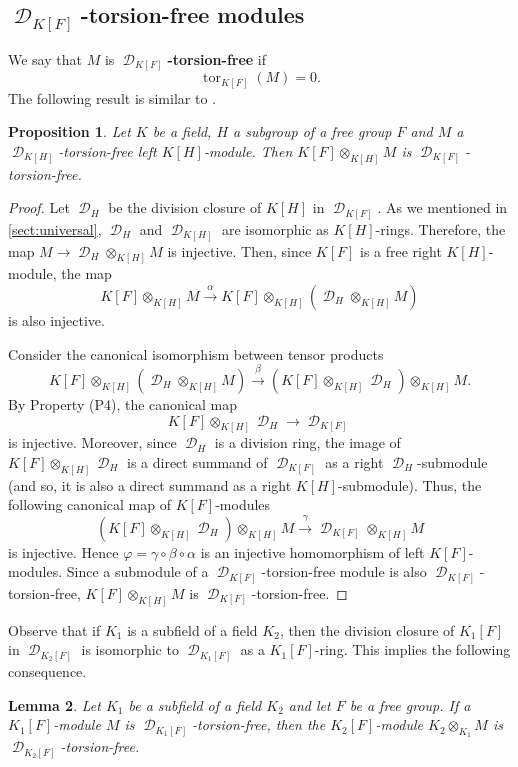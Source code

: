 \documentclass{amsart}
\newtheorem{lem}{Lemma}[section]
\newtheorem{pro}[lem]{Proposition}
\theoremstyle{definition}
\theoremstyle{remark}
\DeclareMathOperator{\D}{\mathcal D}
\DeclareMathOperator{\tor}{tor}
\begin{document}
 \subsection{$\D_{K[F]}$-torsion-free modules}
 We say that $M$ is {\bf $\D_{K[F]}$-torsion-free} if $$\tor_{K[F]}(M)=0.$$ 
 The following result is similar to \cite[Lemma 4.7]{Ja24}.
 \begin{pro}
 \label{extabs}  Let $K$ be a field,  $H$   a subgroup of a free group $F$ and
 $M$  a $\D_{K[H]}$-torsion-free left $K[H]$-module. Then $K[F]\otimes_{K[H]} M$ is $\D_{K[F]}$-torsion-free.
 \end{pro}
\begin{proof}   Let $\D_H$ be the division closure of $K[H]$ in $\D_{K[F]}$. As we mentioned in \cref{sect:universal}, $\D_H$ and $\D_{K[H]}$ are isomorphic as  $K[H]$-rings.
Therefore,  the map $ M\to \D_H\otimes_{K[H]}M$ is injective. Then, since $K[F]$ is a free right $K[H]$-module, the map
$$K[F]\otimes_{K[H]}M\xrightarrow {\alpha}K[F]\otimes_{K[H]}( \D_H\otimes_{K[H]} M)$$ is also injective. 

Consider  the canonical isomorphism between tensor products 
$$K[F]\otimes_{K[H]}( \D_H\otimes_{K[H]} M)\xrightarrow {\beta} (K[F]\otimes_{K[H]} \D_H)\otimes_{K[H]} M.$$ 
By Property (P4),
 the canonical map    $$K[F]\otimes_{K[H]} \D_H\to \D_{K[F]}$$ is injective. Moreover, since $\D_H$ is a division ring, the image of $K[F]\otimes_{K[H]} \D_H$  is a direct    summand of $\D_{K[F]}$ as a right $\D_H$-submodule (and so, it is also a direct  summand as a right $K[H]$-submodule). Thus,  the following canonical map  of $K[F]$-modules
 $$ (K[F]\otimes_{K[H]} \D_H)\otimes_{K[H]}M \xrightarrow {\gamma}  \D_{K[F]}\otimes_{K[H]} M$$ 
 is injective. 
Hence $\varphi=\gamma\circ \beta\circ \alpha$ is an injective homomorphism of left $K[F]$-modules. Since a submodule of a $\D_{K[F]}$-torsion-free module is also  $\D_{K[F]}$-torsion-free,
 $K[F]\otimes_{K[H]} M$ is $\D_{K[F]}$-torsion-free.
\end{proof}

 Observe that if $K_1$ is a subfield of a field $K_2$, then the division closure of $K_1[F]$ in $\D_{K_2[F]}$ is isomorphic to $\D_{K_1[F]}$ as a $K_1[F]$-ring. This implies the following consequence.
\begin{lem} \label{extcuerpostf} 
Let $K_1$ be  a subfield of a field $K_2$ and let $F$ be a free group. If a $K_1[F]$-module $M$ is $\D_{K_1[F]}$-torsion-free, then the $K_2[F]$-module $K_2\otimes_{K_1} M$ is $\D_{K_2[F]}$-torsion-free.
\end{lem}
\end{document}
